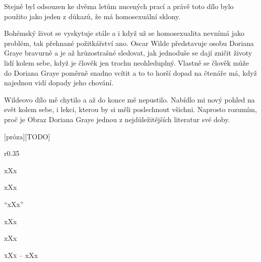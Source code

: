 \documentclass{extarticle} %
\begin{document}
\noindent
Stejně byl odsouzen ke dvěma letům nucených prací a právě toto dílo bylo použito jako jeden z důkazů, že má homosexuální sklony.

\noindent
Bohémský život se vyskytuje stále a i když už se homosexualita nevnímá jako problém, tak přehnané požitkářství ano.
Oscar Wilde představuje osobu Doriana Graye bravurně a je až hrůzostrašné sledovat, jak jednoduše se dají zničit životy lidí kolem sebe, když je člověk jen trochu neohleduplný.
Vlastně se člověk může do Doriana Graye poměrně snadno vcítit a to to horší dopad na čtenáře má, když najednou vidí dopady jeho chování.

\noindent 
Wildeovo dílo mě chytilo a až do konce mě nepustilo.
Nabídlo mi nový pohled na svět kolem sebe, i lekci, kterou by si měli poslechnout všichni.
Naprosto rozumím, proč je Obraz Doriana Graye jednou z nejdůležitějších literatur své doby.

\vfill


\newpage


\changefontsize{8pt}

[próza][TODO]

\noindent\begin{wrapfigure}{r}{0.35\textwidth}
\tiny

\setlength{\parindent}{3pt}
xXx
\end{wrapfigure}


\noindent xXx



\noindent 
\enquote{xXx}

\noindent 
xXx

\noindent 
xXx

\noindent 
\textsc{xXx --} xXx \\
\end{document}
